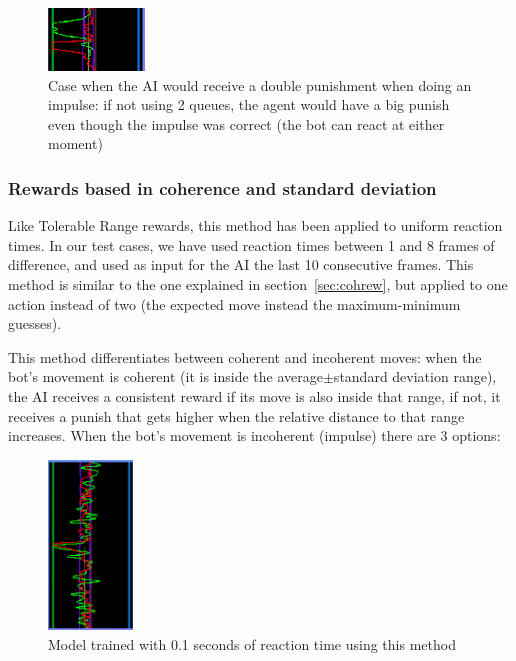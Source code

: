 \begin{figure}[h]
  \centering
		\includegraphics[width=.3\textwidth]{img/punDelay.png}
  \caption{Case when the AI would receive a double punishment when doing an impulse: if not using 2 queues, the agent would have a big punish even though the impulse was correct (the bot can react at either moment)}
  \label{fig:punDelay}
\end{figure}

\subsubsection{Rewards based in coherence and standard deviation}
\label{sec:rewchstd}

Like Tolerable Range rewards, this method has been applied to uniform reaction times. In our test cases, we have used reaction times between 1 and 8 frames of difference, and used as input for the AI the last 10 consecutive frames. This method is similar to the one explained in section~\ref{sec:cohrew}, but applied to one action instead of two (the expected move instead the maximum-minimum guesses).

This method differentiates between coherent and incoherent moves: when the bot's movement is coherent (it is inside the average$\pm$standard deviation range), the AI receives a consistent reward if its move is also inside that range, if not, it receives a punish that gets higher when the relative distance to that range increases. When the bot's movement is incoherent (impulse) there are 3 options:

\begin{figure}
    \centering
    \includegraphics[width=0.2\textwidth]{img/graphRTstd.png}
		\caption{Model trained with 0.1 seconds of reaction time using this method}
		\label{fig:graphRTstd}
\end{figure}

